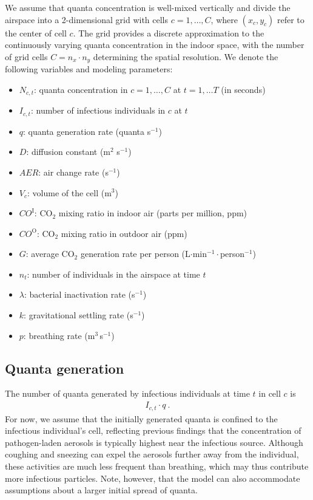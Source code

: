 \documentclass[fleqn,11pt]{wlscirep_supp}
\begin{document}
We assume that quanta concentration is well-mixed vertically and divide the airspace into a 2-dimensional grid with cells $c = 1, \dots, C$, where $(x_c, y_c)$ refer to the center of cell $c$. The grid provides a discrete approximation to the continuously varying quanta concentration in the indoor space, with the number of grid cells $C = n_x \cdot n_y$ determining the spatial resolution. We denote the following variables and modeling parameters:
\begin{itemize}
    \item $N_{c,t}$: quanta concentration in $c = 1, \dots, C$ at $t = 1, \dots T$ (in seconds)
    \item $I_{c,t}$: number of infectious individuals in $c$ at $t$
    \item $q$: quanta generation rate (quanta s$^{-1}$)
    \item $D$: diffusion constant (m$^2$ s$^{-1}$)
    \item $AER$: air change rate (s$^{-1}$)
    \item $V_c$: volume of the cell (m$^3$)
    \item $CO^{\text{I}}$: CO$_2$ mixing ratio in indoor air (parts per million, ppm)
    \item $CO^{\text{O}}$: CO$_2$ mixing ratio in outdoor air (ppm)
    \item $G$: average CO$_2$ generation rate per person (L$\cdot$min$^{-1}\cdot$person$^{-1}$)
    \item $n_t$: number of individuals in the airspace at time $t$
    \item $\lambda$: bacterial inactivation rate (s$^{-1}$)
    \item $k$: gravitational settling rate (s$^{-1}$)
    \item $p$: breathing rate (m$^3$\,s$^{-1}$)
\end{itemize}

\subsection{Quanta generation}\label{sec:quanta-generation}

The number of quanta generated by infectious individuals at time $t$ in cell $c$ is 
\begin{align}\label{eq:generation}
    I_{c,t} \cdot q ~.
\end{align}
For now, we assume that the initially generated quanta is confined to the infectious individual's cell, reflecting previous findings that the concentration of pathogen-laden aerosols is typically highest near the infectious source\cite{Wang2021Science,Morawska2021,Vuorinen2020SafSci,Chen2020BuildEnv}. Although coughing and sneezing can expel the aerosols further away from the individual, these activities are much less frequent than breathing, which may thus contribute more infectious particles\cite{Dinkele2022AJRCCM}. Note, however, that the model can also accommodate assumptions about a larger initial spread of quanta.
\end{document}
